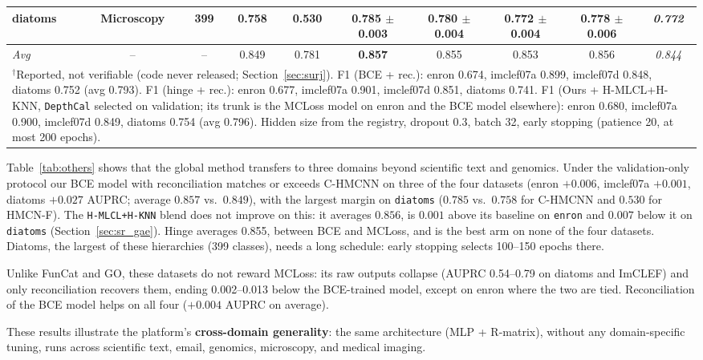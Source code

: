 \documentclass[preprint,12pt]{elsarticle}
\begin{document}
\begin{table}[htbp]
{\begin{tabular}{lccccccccc}
diatoms    & Microscopy      & 399 & 0.758 & 0.530 & \textbf{0.785} $\pm$ 0.003 & 0.780 $\pm$ 0.004 & 0.772 $\pm$ 0.004 & 0.778 $\pm$ 0.006 & \textit{0.772} \\
\midrule
\textit{Avg} & --            & --  & 0.849 & 0.781 & \textbf{0.857} & 0.855 & 0.853 & 0.856 & \textit{0.844} \\
\bottomrule
\multicolumn{10}{p{0.97\textwidth}}{\small $^\dagger$Reported, not verifiable
(code never released; Section~\ref{sec:surj}).  F1 (BCE + rec.): enron 0.674, imclef07a 0.899, imclef07d 0.848, diatoms 0.752 (avg 0.793).  F1 (hinge + rec.): enron 0.677, imclef07a 0.901, imclef07d 0.851, diatoms 0.741.  F1 (Ours + H-MLCL+H-KNN, \texttt{DepthCal} selected on validation; its trunk is the MCLoss model on enron and the BCE model elsewhere): enron 0.680, imclef07a 0.900, imclef07d 0.849, diatoms 0.754 (avg 0.796).  Hidden size from the registry, dropout 0.3, batch 32, early stopping (patience 20, at most 200 epochs).} \\
\end{tabular}
}
\end{table}

Table~\ref{tab:others} shows that the global method transfers to three
domains beyond scientific text and genomics.  Under the
validation-only protocol our BCE model with reconciliation matches or
exceeds C-HMCNN on three of the four datasets (enron $+0.006$,
imclef07a $+0.001$, diatoms $+0.027$ AUPRC; average $0.857$ vs.\ $0.849$),
with the largest margin on \texttt{diatoms} ($0.785$ vs.\ $0.758$ for
C-HMCNN and $0.530$ for HMCN-F).  The \texttt{H-MLCL+H-KNN} blend does not
improve on this: it averages $0.856$, is $0.001$ above its baseline on
\texttt{enron} and $0.007$ below it on \texttt{diatoms}
(Section~\ref{sec:sr_gae}).  Hinge averages
0.855, between BCE and MCLoss, and is the best arm on none of the four
datasets.  Diatoms, the
largest of these hierarchies (399 classes), needs a long schedule: early
stopping selects 100--150 epochs there.

Unlike FunCat and GO, these datasets do not reward MCLoss: its raw
outputs collapse (AUPRC 0.54--0.79 on diatoms and ImCLEF) and only
reconciliation recovers them, ending 0.002--0.013 below the
BCE-trained model, except on enron where the two are tied.
Reconciliation of the BCE model helps on all four ($+0.004$ AUPRC on
average).

These results illustrate the platform's \textbf{cross-domain
generality}: the same architecture (MLP + R-matrix), without any
domain-specific tuning, runs across scientific text, email, genomics,
microscopy, and medical imaging.
\end{document}
